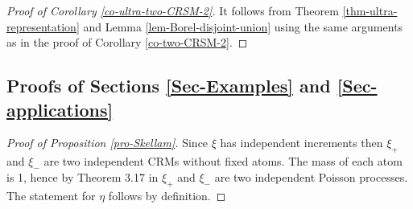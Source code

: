\documentclass{article}
\theoremstyle{plain}
\theoremstyle{remark}
\begin{document}
\begin{proof}[Proof of Corollary \ref{co-ultra-two-CRSM-2}]
	It follows from Theorem \ref{thm-ultra-representation} and Lemma \ref{lem-Borel-disjoint-union} using the same arguments as in the proof of Corollary \ref{co-two-CRSM-2}.
\end{proof}



\subsection*{Proofs of Sections \ref{Sec-Examples} and  \ref{Sec-applications}}




\begin{proof}[Proof of Proposition \ref{pro-Skellam}]
	Since $\xi$ has independent increments then $\xi_+$ and $\xi_-$ are two independent CRMs without fixed atoms. The mass of each atom is 1, hence by Theorem 3.17 in \cite{Kallenberg2} $\xi_+$ and $\xi_-$ are two independent Poisson processes. The statement for $\eta$ follows by definition.
\end{proof}
\end{document}
